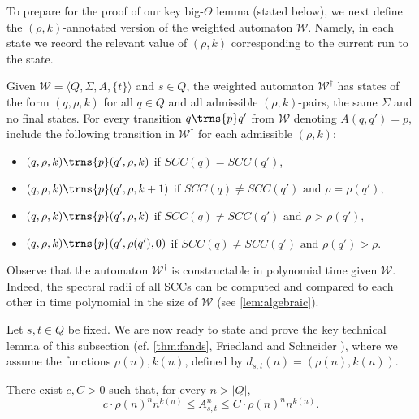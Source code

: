 \documentclass{lmcs}
\theoremstyle{plain}
\theoremstyle{definition}
\theoremstyle{remark}
\newcommand\abra[1]{\langle #1 \rangle}
\newcommand\waannotated{\wa^\dagger}
\newcommand\dgf{d}
\newcommand{\SCC}{\ensuremath{\mathit{SCC}}}
\newcommand\wa{\mathcal{W}}
\begin{document}
To prepare for the proof of our key big-$\Theta$ lemma (stated below),
we next define the $(\rho,k)$-annotated version of the weighted automaton $\wa$.
Namely, in each state we record the relevant value of $(\rho, k)$ corresponding to the current run to the state.
\begin{defi}[The weighted automaton $\waannotated$] \label{defn:annotated} Given $\wa=\abra{Q,\Sigma,A,\{t\}}$ and $s \in Q$,
the weighted automaton $\waannotated$ has states of the form $(q,\rho, k)$ for all $q\in Q$ and all admissible $(\rho,k)$-pairs, the same $\Sigma$ and no final states.
For every transition $q\trns{p} q'$ from $\wa$ denoting $A(q,q') = p$, include the following transition in $\waannotated$ for
each admissible $(\rho,k)$:
\pagebreak
\begin{itemize}
\item $(q, \rho, k) \trns{p} (q', \rho, k)$ if $\SCC(q) {=}\SCC(q')$,
\item $(q, \rho, k) \trns{p} (q', \rho, k+1)$ if $\SCC(q){\ne}\SCC(q') \text{ and } \rho = \rho(q')$,
\item $(q, \rho, k) \trns{p} (q', \rho, k)$ if $\SCC(q){\ne}\SCC(q') \text{ and } \rho > \rho(q')$,
\item $(q, \rho, k) \trns{p} (q', \rho(q'), 0)$ if $\SCC(q){\ne}\SCC(q') \text{ and } \rho(q') > \rho$.
\end{itemize}

\end{defi}
Observe that the automaton $\waannotated$ is constructable in polynomial time given $\wa$. Indeed, the spectral radii of all SCCs can be computed and compared to each other in time polynomial in the size of $\wa$ (see \cref{lem:algebraic}).

Let $s,t\in Q$ be fixed. We are now ready to state and prove the key technical lemma of this subsection (cf. \cref{thm:fands}, Friedland and Schneider \cite{friedland1980growth,schneider1986influence}), where we assume the functions $\rho(n), k(n)$, defined by  $\dgf_{s,t}(n) = (\rho(n), k(n))$.
\begin{lem} \label{lemma:unarythetabound}
There exist $c,C > 0$ such that, for every $n > |Q|$,
\[
  c \cdot \rho(n)^n n^{k(n)} \le A^n_{s,t} \le C \cdot \rho(n)^n n^{k(n)}.
\]
\end{lem}
\end{document}
